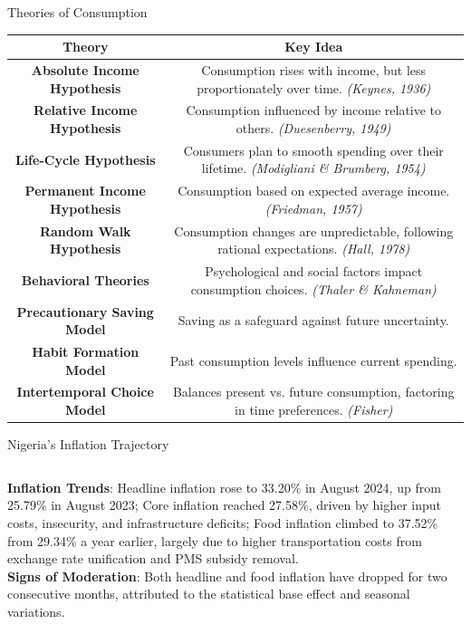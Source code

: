 \documentclass{beamer}
\begin{document}
{\begin{frame}{Theories of Consumption}
\resizebox{\textwidth}{!}
{
\begin{tabular}{|c|c|} 
\hline
\textbf{Theory} & \textbf{Key Idea} \\
\hline
\textbf{Absolute Income Hypothesis} & Consumption rises with income, but less proportionately over time. \textit{(Keynes, 1936)} \\
\hline
\textbf{Relative Income Hypothesis} & Consumption influenced by income relative to others. \textit{(Duesenberry, 1949)} \\
\hline
\textbf{Life-Cycle Hypothesis} & Consumers plan to smooth spending over their lifetime. \textit{(Modigliani \& Brumberg, 1954)} \\
\hline
\textbf{Permanent Income Hypothesis} & Consumption based on expected average income. \textit{(Friedman, 1957)} \\
\hline
\textbf{Random Walk Hypothesis} & Consumption changes are unpredictable, following rational expectations. \textit{(Hall, 1978)} \\
\hline
\textbf{Behavioral Theories} & Psychological and social factors impact consumption choices. \textit{(Thaler \& Kahneman)} \\
\hline
\textbf{Precautionary Saving Model} & Saving as a safeguard against future uncertainty. \\
\hline
\textbf{Habit Formation Model} & Past consumption levels influence current spending. \\
\hline
\textbf{Intertemporal Choice Model} & Balances present vs. future consumption, factoring in time preferences. \textit{(Fisher)} \\
\hline
\end{tabular}
}
\end{frame}
\begin{frame}{Nigeria's Inflation Trajectory}
\begin{columns}[onlytextwidth]
 \textbf{Inflation Trends}:
Headline inflation rose to 33.20\% in August 2024, up from 25.79\% in August 2023; Core inflation reached 27.58\%, driven by higher input costs, insecurity, and infrastructure deficits; Food inflation climbed to 37.52\% from 29.34\% a year earlier, largely due to higher transportation costs from exchange rate unification and PMS subsidy removal.\\
\textbf{Signs of Moderation}: Both headline and food inflation have dropped for two consecutive months, attributed to the statistical base effect and seasonal variations.\\

\end{columns}
\end{frame}}
\end{document}
